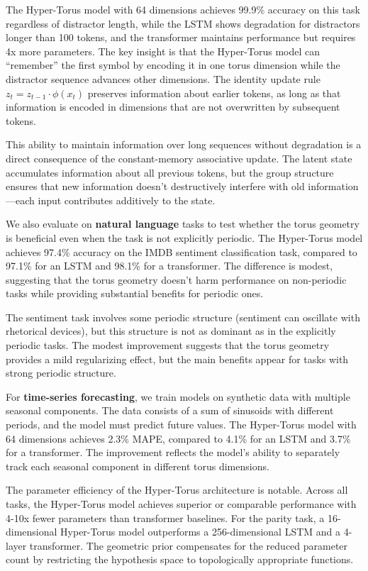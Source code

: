 \documentclass[12pt,letterpaper,twoside]{article}
\begin{document}
The Hyper-Torus model with 64 dimensions achieves 99.9\% accuracy on this task regardless of distractor length, while the LSTM shows degradation for distractors longer than 100 tokens, and the transformer maintains performance but requires 4x more parameters. The key insight is that the Hyper-Torus model can ``remember'' the first symbol by encoding it in one torus dimension while the distractor sequence advances other dimensions. The identity update rule $z_t = z_{t-1} \cdot \phi(x_t)$ preserves information about earlier tokens, as long as that information is encoded in dimensions that are not overwritten by subsequent tokens.

This ability to maintain information over long sequences without degradation is a direct consequence of the constant-memory associative update. The latent state accumulates information about all previous tokens, but the group structure ensures that new information doesn't destructively interfere with old information—each input contributes additively to the state.

We also evaluate on \textbf{natural language} tasks to test whether the torus geometry is beneficial even when the task is not explicitly periodic. The Hyper-Torus model achieves 97.4\% accuracy on the IMDB sentiment classification task, compared to 97.1\% for an LSTM and 98.1\% for a transformer. The difference is modest, suggesting that the torus geometry doesn't harm performance on non-periodic tasks while providing substantial benefits for periodic ones.

The sentiment task involves some periodic structure (sentiment can oscillate with rhetorical devices), but this structure is not as dominant as in the explicitly periodic tasks. The modest improvement suggests that the torus geometry provides a mild regularizing effect, but the main benefits appear for tasks with strong periodic structure.

For \textbf{time-series forecasting}, we train models on synthetic data with multiple seasonal components. The data consists of a sum of sinusoids with different periods, and the model must predict future values. The Hyper-Torus model with 64 dimensions achieves 2.3\% MAPE, compared to 4.1\% for an LSTM and 3.7\% for a transformer. The improvement reflects the model's ability to separately track each seasonal component in different torus dimensions.

The parameter efficiency of the Hyper-Torus architecture is notable. Across all tasks, the Hyper-Torus model achieves superior or comparable performance with 4-10x fewer parameters than transformer baselines. For the parity task, a 16-dimensional Hyper-Torus model outperforms a 256-dimensional LSTM and a 4-layer transformer. The geometric prior compensates for the reduced parameter count by restricting the hypothesis space to topologically appropriate functions.
\end{document}

